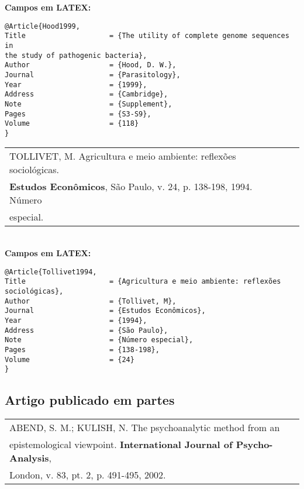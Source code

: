 \textbf{Campos em LATEX:} 
	
\begingroup
\fontsize{10pt}{12pt}\selectfont
\begin{verbatim}
@Article{Hood1999,
Title                    = {The utility of complete genome sequences in 
the study of pathogenic bacteria},
Author                   = {Hood, D. W.},
Journal                  = {Parasitology},
Year                     = {1999},
Address                  = {Cambridge},
Note                     = {Supplement},
Pages                    = {S3-S9},
Volume                   = {118}
}
\end{verbatim}
\endgroup
	
\begin{tabular}{|l|c|} \hline
	TOLLIVET, M. Agricultura e meio ambiente: reflexões sociológicas. \\\textbf{Estudos Econômicos},  São Paulo, v. 24, p. 138-198, 1994. Número \\especial. 
	                                                                    \\\hline
\end{tabular} \\
	
\textbf{Campos em LATEX:} 
	
\begingroup
\fontsize{10pt}{12pt}\selectfont
\begin{verbatim}
@Article{Tollivet1994,
Title                    = {Agricultura e meio ambiente: reflexões 
sociológicas},
Author                   = {Tollivet, M},
Journal                  = {Estudos Econômicos},
Year                     = {1994},
Address                  = {São Paulo},
Note                     = {Número especial},
Pages                    = {138-198},
Volume                   = {24}
}
\end{verbatim}
\endgroup
\subsection{Artigo publicado em partes}
	
\begin{tabular}{|l|c|} \hline
	ABEND, S. M.; KULISH, N. The psychoanalytic method from an                    \\
	epistemological viewpoint. \textbf{International Journal of Psycho-Analysis}, \\London, v. 83, pt. 2, p. 491-495, 2002. \\\hline
\end{tabular} \\
	
